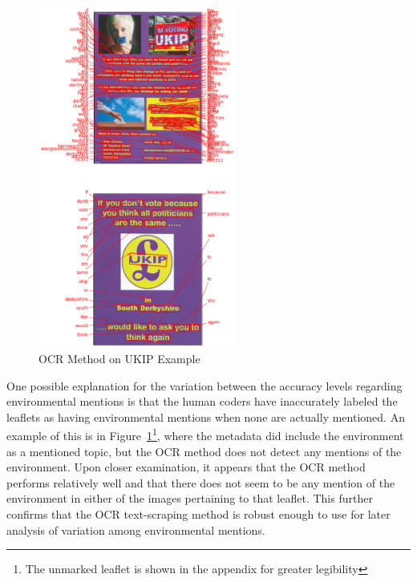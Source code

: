 \documentclass[preprint]{elsarticle} %
\begin{document}
\begin{figure} %
	\centering
	\includegraphics[width=0.58\textwidth]{ukip_example.png}
	\caption{OCR Method on UKIP Example}
	\label{fig:ukip_example}
\end{figure}




One possible explanation for the variation between the accuracy levels regarding environmental mentions is that the human coders have inaccurately labeled the leaflets as having environmental mentions when none are actually mentioned. An example of this is in Figure~\ref{fig:ukip_example}\footnote{The unmarked leaflet is shown in the appendix for greater legibility}, where the metadata did include the environment as a mentioned topic, but the OCR method does not detect any mentions of the environment. Upon closer examination, it appears that the OCR method performs relatively well and that there does not seem to be any mention of the environment in either of the images pertaining to that leaflet. This further confirms that the OCR text-scraping method is robust enough to use for later analysis of variation among environmental mentions. 
\end{document}
